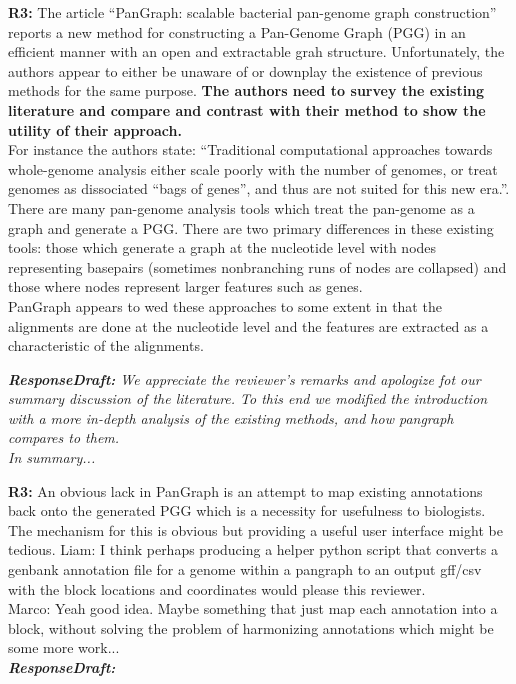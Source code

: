 \documentclass[aps,rmp,onecolumn]{revtex4-1}
\newcommand{\Marco}[1]{{\color{gray}Marco: #1}}
\newcommand{\Liam}[1]{{\color{teal}Liam: #1}}
\newcommand{\reviewer}[2]{\textbf{#1:} #2\vskip 5mm}
\newcommand{\responsedraft}[1]{{\it {\color{purple}\textbf{ResponseDraft:} #1}}\vskip 5mm}
\begin{document}
\reviewer{R3}{The article ``PanGraph: scalable bacterial pan-genome graph construction'' reports a new method for constructing a Pan-Genome Graph (PGG) in an efficient manner with an open and extractable grah structure. Unfortunately, the authors appear to either be unaware of or downplay the existence of previous methods for the same purpose.\textbf{ The authors need to survey the existing literature and compare and contrast with their method to show the utility of their approach.}\\
      For instance the authors state: ``Traditional computational approaches towards whole-genome analysis either scale poorly with the number of genomes, or treat genomes as dissociated ``bags of genes'', and thus are not suited for this new era.''. There are many pan-genome analysis tools which treat the pan-genome as a graph and generate a PGG. There are two primary differences in these existing tools: those which generate a graph at the nucleotide level with nodes representing basepairs (sometimes nonbranching runs of nodes are collapsed) and those where nodes represent larger features such as genes.\\
      PanGraph appears to wed these approaches to some extent in that the alignments are done at the nucleotide level and the features are extracted as a characteristic of the alignments.}

\responsedraft{We appreciate the reviewer's remarks and apologize fot our summary discussion of the literature. To this end we modified the introduction with a more in-depth analysis of the existing methods, and how pangraph compares to them.\\
      In summary...}

\reviewer{R3}{An obvious lack in PanGraph is an attempt to map existing annotations back onto the generated PGG which is a necessity for usefulness to biologists. The mechanism for this is obvious but providing a useful user interface might be tedious.}
\Liam{I think perhaps producing a helper python script that converts a genbank annotation file for a genome within a pangraph to an output gff/csv with the block locations and coordinates would please this reviewer.}\\
\Marco{Yeah good idea. Maybe something that just map each annotation into a block, without solving the problem of harmonizing annotations which might be some more work...}\\
\responsedraft{}
\end{document}
